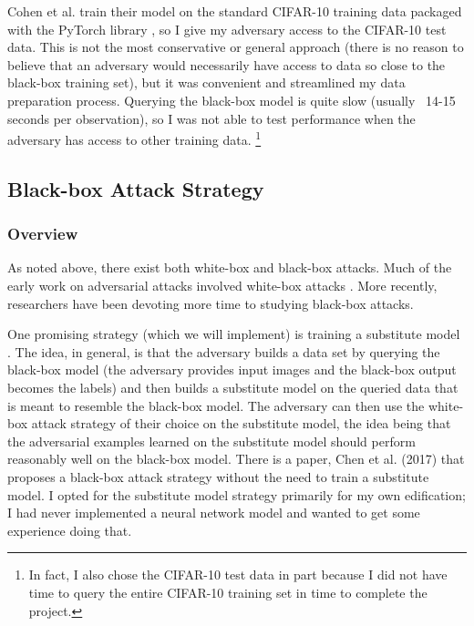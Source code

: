 \documentclass{article}
\begin{document}
Cohen et al. train their model on the standard CIFAR-10 training data \cite{K09} packaged with the PyTorch library \cite{PGCCYDLDAL17}, so I give my adversary access to the CIFAR-10 test data. This is not the most conservative or general approach (there is no reason to believe that an adversary would necessarily have access to data so close to the black-box training set), but it was convenient and streamlined my data preparation process. Querying the black-box model is quite slow (usually ~14-15 seconds per observation), so I was not able to test performance when the adversary has access to other training data. \footnote{In fact, I also chose the CIFAR-10 test data in part because I did not have time to query the entire CIFAR-10 training set in time to complete the project.}

\subsection{Black-box Attack Strategy}

\subsubsection{Overview}
As noted above, there exist both white-box and black-box attacks. Much of the early work on adversarial attacks involved white-box attacks \cite{GSS14} \cite{MFF15}. More recently, researchers have been devoting more time to studying black-box attacks. \newline

One promising strategy (which we will implement) is training a substitute model \cite{PMGJCS16} \cite{IEAL18}. The idea, in general, is that the adversary builds a data set by querying the black-box model (the adversary provides input images and the black-box output becomes the labels) and then builds a substitute model on the queried data that is meant to resemble the black-box model. The adversary can then use the white-box attack strategy of their choice on the substitute model, the idea being that the adversarial examples learned on the substitute model should perform reasonably well on the black-box model. There is a paper, Chen et al. (2017) \cite{CZSYH17} that proposes a black-box attack strategy without the need to train a substitute model. I opted for the substitute model strategy primarily for my own edification; I had never implemented a neural network model and wanted to get some experience doing that. \newline
\end{document}
